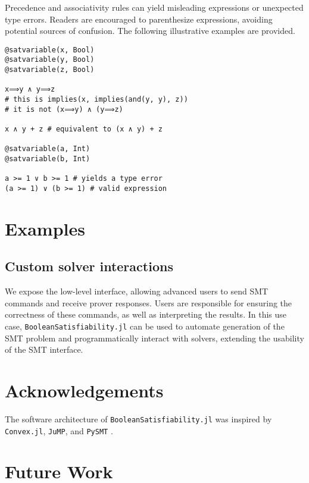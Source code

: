 \documentclass[conference]{IEEEtran}
\begin{document}
Precedence and associativity rules can yield misleading expressions or unexpected type errors. Readers are encouraged to parenthesize expressions, avoiding potential sources of confusion. The following illustrative examples are provided.

\begin{verbatim}
@satvariable(x, Bool)
@satvariable(y, Bool)
@satvariable(z, Bool)

x⟹y ∧ y⟹z
# this is implies(x, implies(and(y, y), z))
# it is not (x⟹y) ∧ (y⟹z)

x ∧ y + z # equivalent to (x ∧ y) + z

@satvariable(a, Int)
@satvariable(b, Int)

a >= 1 ∨ b >= 1 # yields a type error
(a >= 1) ∨ (b >= 1) # valid expression
\end{verbatim}

\section{Examples}

\subsection*{Custom solver interactions}
We expose the low-level interface, allowing advanced users to send SMT commands and receive prover responses. Users are responsible for ensuring the correctness of these commands, as well as interpreting the results. In this use case, \verb|BooleanSatisfiability.jl| can be used to automate generation of the SMT problem and programmatically interact with solvers, extending the usability of the SMT interface.

\section{Acknowledgements}
The software architecture of \verb|BooleanSatisfiability.jl| was inspired by \verb|Convex.jl|, \verb|JuMP|, and \verb|PySMT| \cite{convexjl, Lubin2023, pysmt2015}.

\section{Future Work}

\printbibliography


\end{document}
